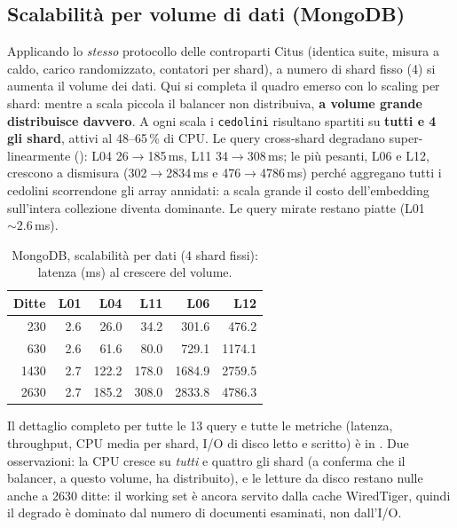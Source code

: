 \subsection{Scalabilità per volume di dati (MongoDB)}
\label{sec:mongo-dati}
Applicando lo \emph{stesso} protocollo delle controparti Citus (identica suite, misura a caldo, carico
randomizzato, contatori per shard), a numero di shard fisso (4) si aumenta il volume dei dati. Qui si completa
il quadro emerso con lo scaling per shard: mentre a scala piccola il balancer non distribuiva, \textbf{a volume
grande distribuisce davvero}. A ogni scala i
\texttt{cedolini} risultano spartiti su \textbf{tutti e 4 gli shard}, attivi al 48--65\,\% di CPU. Le query
cross-shard degradano super-linearmente (): L04 26$\to$185\,ms, L11 34$\to$308\,ms; le
più pesanti, L06 e L12, crescono a dismisura (302$\to$2834\,ms e 476$\to$4786\,ms) perché aggregano tutti i cedolini
scorrendone gli array annidati: a scala grande il costo dell'embedding sull'intera collezione diventa
dominante. Le query mirate restano piatte (L01 ${\sim}2.6$\,ms).

\begin{table}[htbp]
  \centering
  \caption{MongoDB, scalabilità per dati (4 shard fissi): latenza (ms) al crescere del volume.}
  \label{tab:mongo-dati}
  \begin{tabular}{rrrrrr}
    \toprule
    \textbf{Ditte} & \textbf{L01} & \textbf{L04} & \textbf{L11} & \textbf{L06} & \textbf{L12} \\
    \midrule
     230 & 2.6 & 26.0  & 34.2  & 301.6  & 476.2  \\
     630 & 2.6 & 61.6  & 80.0  & 729.1  & 1174.1 \\
    1430 & 2.7 & 122.2 & 178.0 & 1684.9 & 2759.5 \\
    2630 & 2.7 & 185.2 & 308.0 & 2833.8 & 4786.3 \\
    \bottomrule
  \end{tabular}
\end{table}

Il dettaglio completo per tutte le 13 query e tutte le metriche (latenza, throughput, CPU media per shard,
I/O di disco letto e scritto) è in . Due osservazioni: la CPU cresce su
\emph{tutti} e quattro gli shard (a conferma che il balancer, a questo volume, ha distribuito), e le letture
da disco restano nulle anche a 2630 ditte: il working set è ancora servito dalla cache WiredTiger, quindi
il degrado è dominato dal numero di documenti esaminati, non dall'I/O.

